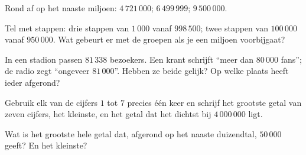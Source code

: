\begin{exercise}[$\star$]\label{exo:g4:numbers:7}
Rond af op het naaste miljoen: $4\,721\,000$; \quad $6\,499\,999$;
\quad $9\,500\,000$.
\end{exercise}

\begin{exercise}[$\star$]\label{exo:g4:numbers:8}
Tel met stappen: drie stappen van $1\,000$ vanaf $998\,500$; twee stappen
van $100\,000$ vanaf $950\,000$. Wat gebeurt er met de groepen als je een
miljoen voorbijgaat?
\end{exercise}

\begin{exercise}[$\star$]\label{exo:g4:numbers:9}
In een stadion passen $81\,338$ bezoekers. Een krant schrijft ``meer dan
$80\,000$ fans''; de radio zegt ``ongeveer $81\,000$''. Hebben ze beide
gelijk? Op welke plaats heeft ieder afgerond?
\end{exercise}

\begin{exercise}[$\star\star$]\label{exo:g4:numbers:10}
Gebruik elk van de cijfers $1$ tot $7$ precies één keer en schrijf het
grootste getal van zeven cijfers, het kleinste, en het getal dat het
dichtst bij $4\,000\,000$ ligt.
\end{exercise}

\begin{exercise}[$\star\star$]\label{exo:g4:numbers:11}
Wat is het grootste hele getal dat, afgerond op het naaste duizendtal,
$50\,000$ geeft? En het kleinste?
\end{exercise}
